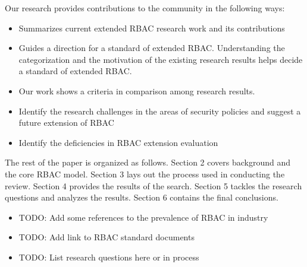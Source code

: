 Our research provides contributions to the community in the following ways:

\begin{itemize}
\item Summarizes current extended RBAC research work and its contributions
\item Guides a direction for a standard of extended RBAC. Understanding the categorization and the motivation of the existing research results helps decide a standard of extended RBAC.
\item Our work shows a criteria in comparison among research results.
\item Identify the research challenges in the areas of security policies and suggest a future extension of RBAC
\item Identify the deficiencies in RBAC extension evaluation
\end{itemize}

The rest of the paper is organized as follows.  Section 2 covers background and the core RBAC model. Section 3 lays out the process used in conducting the review. Section 4 provides the results of the search. Section 5 tackles the research questions and analyzes the results.  Section 6 contains the final conclusions.

\begin{itemize}
\item TODO: Add some references to the prevalence of RBAC in industry
\item TODO: Add link to RBAC standard documents
\item TODO: List research questions here or in process
\end{itemize}

